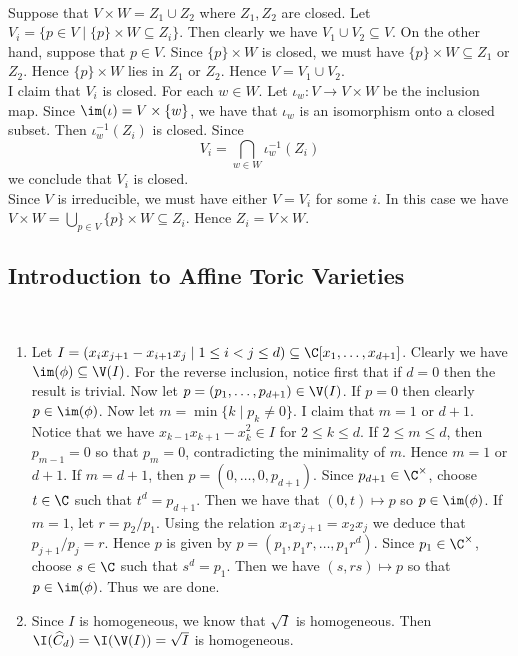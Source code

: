 \documentclass[a4paper]{article}
\begin{document}
\begin{ex}{}{}\\
Suppose that $V\times W=Z_1\cup Z_2$ where $Z_1,Z_2$ are closed. Let $V_i=\{p\in V\;|\;\{p\}\times W\subseteq Z_i\}$. Then clearly we have $V_1\cup V_2\subseteq V$. On the other hand, suppose that $p\in V$. Since $\{p\}\times W$ is closed, we must have $\{p\}\times W\subseteq Z_1$ or $Z_2$. Hence $\{p\}\times W$ lies in $Z_1$ or $Z_2$. Hence $V=V_1\cup V_2$. \\

I claim that $V_i$ is closed. For each $w\in W$. Let $\iota_w:V\to V\times W$ be the inclusion map. Since $\im(\iota)=V\times\{w\}$, we have that $\iota_w$ is an isomorphism onto a closed subset. Then $\iota_w^{-1}(Z_i)$ is closed. Since $$V_i=\bigcap_{w\in W}\iota_w^{-1}(Z_i)$$ we conclude that $V_i$ is closed. \\

Since $V$ is irreducible, we must have either $V=V_i$ for some $i$. In this case we have $V\times W=\bigcup_{p\in V}\{p\}\times W\subseteq Z_i$. Hence $Z_i=V\times W$. 
\end{ex}

\subsection{Introduction to Affine Toric Varieties}
\begin{ex}{}{}\\
\begin{enumerate}[label=(\alph*)]
\item Let $I=(x_ix_{j+1}-x_{i+1}x_j\;|\;1\leq i<j\leq d)\subseteq\C[x_1,\dots,x_{d+1}]$. Clearly we have $\im(\phi)\subseteq\V(I)$. For the reverse inclusion, notice first that if $d=0$ then the result is trivial. Now let $p=(p_1,\dots,p_{d+1})\in\V(I)$. If $p=0$ then clearly $p\in\im(\phi)$. Now let $m=\min\{k\;|\;p_k\neq 0\}$. I claim that $m=1$ or $d+1$. Notice that we have $x_{k-1}x_{k+1}-x_k^2\in I$ for $2\leq k\leq d$. If $2\leq m\leq d$, then $p_{m-1}=0$ so that $p_m=0$, contradicting the minimality of $m$. Hence $m=1$ or $d+1$. If $m=d+1$, then $p=(0,\dots,0,p_{d+1})$. Since $p_{d+1}\in\C^\times$, choose $t\in\C$ such that $t^d=p_{d+1}$. Then we have that $(0,t)\mapsto p$ so $p\in\im(\phi)$. If $m=1$, let $r=p_2/p_1$. Using the relation $x_1x_{j+1}=x_2x_j$ we deduce that $p_{j+1}/p_j=r$. Hence $p$ is given by $p=(p_1,p_1r,\dots,p_1r^d)$. Since $p_1\in\C^\times$, choose $s\in\C$ such that $s^d=p_1$. Then we have $(s,rs)\mapsto p$ so that $p\in\im(\phi)$. Thus we are done. 
\item Since $I$ is homogeneous, we know that $\sqrt{I}$ is homogeneous. Then $\I(\widehat{C}_d)=\I(\V(I))=\sqrt{I}$ is homogeneous. 
\end{enumerate}
\end{ex}
\end{document}
